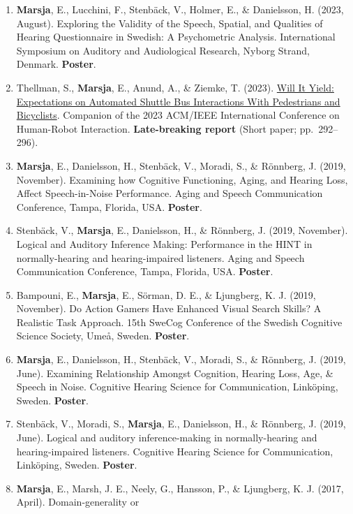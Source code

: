 \documentclass[]{article}
\begin{document}
\begin{enumerate}
  Potsdam, Germany. \textbf{Oral presentation} (Danielsson presented).
\item
  \textbf{Marsja}, E., Lucchini, F., Stenbäck, V., Holmer, E., \&
  Danielsson, H. (2023, August). Exploring the Validity of the Speech,
  Spatial, and Qualities of Hearing Questionnaire in Swedish: A
  Psychometric Analysis. International Symposium on Auditory and
  Audiological Research, Nyborg Strand, Denmark. \textbf{Poster}.
\item
  Thellman, S., \textbf{Marsja}, E., Anund, A., \& Ziemke, T. (2023).
  \href{https://doi.org/10.1145/3568294.3580091}{Will It Yield:
  Expectations on Automated Shuttle Bus Interactions With Pedestrians
  and Bicyclists}. Companion of the 2023 ACM/IEEE International
  Conference on Human-Robot Interaction. \textbf{Late-breaking report}
  (Short paper; pp.~292--296).
\item
  \textbf{Marsja}, E., Danielsson, H., Stenbäck, V., Moradi, S., \&
  Rönnberg, J. (2019, November). Examining how Cognitive Functioning,
  Aging, and Hearing Loss, Affect Speech-in-Noise Performance. Aging and
  Speech Communication Conference, Tampa, Florida, USA. \textbf{Poster}.
\item
  Stenbäck, V., \textbf{Marsja}, E., Danielsson, H., \& Rönnberg, J.
  (2019, November). Logical and Auditory Inference Making: Performance
  in the HINT in normally-hearing and hearing-impaired listeners. Aging
  and Speech Communication Conference, Tampa, Florida, USA.
  \textbf{Poster}.
\item
  Bampouni, E., \textbf{Marsja}, E., Sörman, D. E., \& Ljungberg, K. J.
  (2019, November). Do Action Gamers Have Enhanced Visual Search Skills?
  A Realistic Task Approach. 15th SweCog Conference of the Swedish
  Cognitive Science Society, Umeå, Sweden. \textbf{Poster}.
\item
  \textbf{Marsja}, E., Danielsson, H., Stenbäck, V., Moradi, S., \&
  Rönnberg, J. (2019, June). Examining Relationship Amongst Cognition,
  Hearing Loss, Age, \& Speech in Noise. Cognitive Hearing Science for
  Communication, Linköping, Sweden. \textbf{Poster}.
\item
  Stenbäck, V., Moradi, S., \textbf{Marsja}, E., Danielsson, H., \&
  Rönnberg, J. (2019, June). Logical and auditory inference-making in
  normally-hearing and hearing-impaired listeners. Cognitive Hearing
  Science for Communication, Linköping, Sweden. \textbf{Poster}.
\item
  \textbf{Marsja}, E., Marsh, J. E., Neely, G., Hansson, P., \&
  Ljungberg, K. J. (2017, April). Domain-generality or

\end{enumerate}
\end{document}
